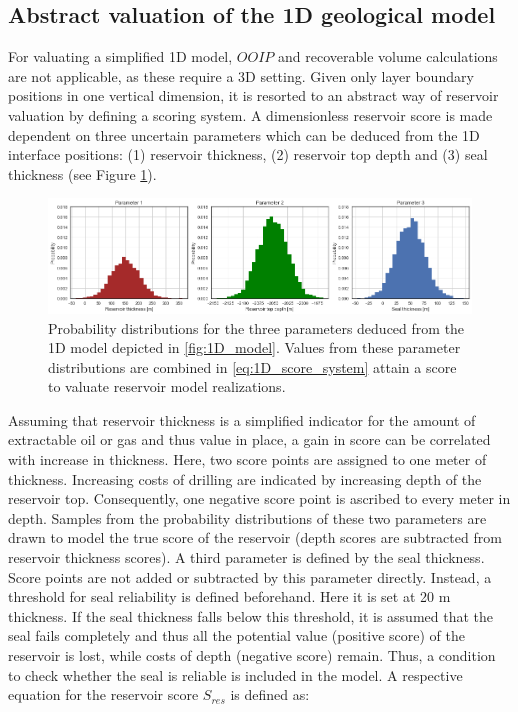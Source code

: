 	        \subsection{Abstract valuation of the 1D geological model}\label{sec:1D_score_system}
	        For valuating a simplified 1D model, $OOIP$ and recoverable volume calculations are not applicable, as these require a 3D setting. Given only layer boundary positions in one vertical dimension, it is resorted to an abstract way of reservoir valuation by defining a scoring system. A dimensionless reservoir score is made dependent on three uncertain parameters which can be deduced from the 1D interface positions: (1) reservoir thickness, (2) reservoir top depth and (3) seal thickness (see Figure \ref{fig:3_parameters}).
	        	
	        \begin{figure}[h]
	        	\centering
	        	\includegraphics[width=1\textwidth]{Figures/3_parameters.png}
	        	\caption{Probability distributions for the three parameters deduced from the 1D model depicted in \ref{fig:1D_model}. Values from these parameter distributions are combined in \ref{eq:1D_score_system} attain a score to valuate reservoir model realizations.}\label{fig:3_parameters}
	        \end{figure}
	        
	        Assuming that reservoir thickness is a simplified indicator for the amount of extractable oil or gas and thus value in place, a gain in score can be correlated with increase in thickness. Here, two score points are assigned to one meter of thickness. Increasing costs of drilling are indicated by increasing depth of the reservoir top. Consequently, one negative score point is ascribed to every meter in depth. Samples from the probability distributions of these two parameters are drawn to model the true score of the reservoir (depth scores are subtracted from reservoir thickness scores).
	        A third parameter is defined by the seal thickness. Score points are not added or subtracted by this parameter directly. Instead, a threshold for seal reliability is defined beforehand. Here it is set at 20 m thickness. If the seal thickness falls below this threshold, it is assumed that the seal fails completely and thus all the potential value (positive score) of the reservoir is lost, while costs of depth (negative score) remain. Thus, a condition to check whether the seal is reliable is included in the model. A respective equation for the reservoir score $S_{res}$ is defined as:
			
